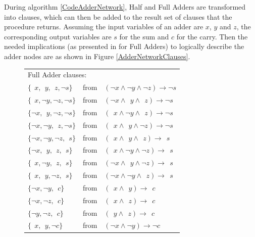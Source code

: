 During algorithm \ref{CodeAdderNetwork}, Half and Full Adders are transformed into clauses, which can then be added to the result set of clauses that the procedure returns. Assuming the input variables of an adder are $x$, $y$ and $z$, the corresponding output variables are $s$ for the sum and $c$ for the carry. Then the needed implications (as presented in \cite{Een2006TranslatingPC} for Full Adders) to logically describe the adder nodes are as shown in Figure \ref{AdderNetworkClauses}.

\begin{figure}
    \centering
    \begin{tabular}{l l l}
    \multicolumn {3}{l}{Full Adder clauses:}\\
     $\{~~x,~~y,~~z,\neg s\}$           & from & $(\neg x   \land \neg y    \land \neg z)   \rightarrow \neg s$ \\
     $\{~~x,\neg y,\neg z,\neg s\}$     & from & $(\neg x   \land ~~y       \land ~~z)      \rightarrow \neg s$ \\
     $\{\neg x,~~y,\neg z,\neg s\}$     & from & $(~~x      \land \neg y    \land ~~z)      \rightarrow \neg s$ \\
     $\{\neg x,\neg y,~~z,\neg s\}$     & from & $(~~x      \land ~~y       \land \neg z)   \rightarrow \neg s$ \\
     $\{\neg x,\neg y,\neg z, ~~s\}$    & from & $(~~x      \land ~~y       \land ~~z)      \rightarrow ~~s$ \\
     $\{\neg x, ~~y, ~~z, ~~s\}$        & from & $(~~x      \land \neg y    \land \neg z)   \rightarrow ~~s$ \\
     $\{~~x, \neg y, ~~z, ~~s\}$        & from & $(\neg x   \land ~~y       \land \neg z)   \rightarrow ~~s$ \\
     $\{~~x, ~~y, \neg z, ~~s\}$        & from & $(\neg x   \land \neg y    \land ~~z)      \rightarrow ~~s$ \\
     $\{\neg x, \neg y, ~~c\}$          & from & $(~~x      \land ~~y)      \rightarrow ~~c$ \\
     $\{\neg x, \neg z, ~~c\}$          & from & $(~~x      \land ~~z)      \rightarrow ~~c$ \\
     $\{\neg y, \neg z, ~~c\}$          & from & $(~~y      \land ~~z)      \rightarrow ~~c$ \\
     $\{~~x, ~~y, \neg c\}$          & from & $(\neg x      \land \neg y)   \rightarrow \neg c$ \\

\end{tabular}
\end{figure}
